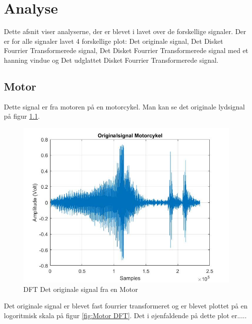 \chapter{Analyse}\label{ch:analyse}
Dette afsnit viser analyserne, der er blevet i lavet over de forskellige signaler. Der er for alle signaler lavet 4 forskellige plot: Det originale signal, Det Disket Fourrier Transformerede signal, Det Disket Fourrier Transformerede signal med et hanning vindue og Det udglattet Disket Fourrier Transformerede signal.


\section{Motor}
Dette signal er fra motoren på en motorcykel. Man kan se det originale lydsignal på figur \ref{fig:Motor original}.
\begin{figure}[H]
	\centering
	\includegraphics[width=140mm]{figures/Motor/original.jpg}
	\caption{DFT Det originale signal fra en Motor}
	\label{fig:Motor original}
\end{figure}

Det originale signal er blevet fast fourrier transformeret og er blevet plottet på en logoritmisk skala på figur \ref{fig:Motor DFT}. Det i øjenfaldende på dette plot er.....

